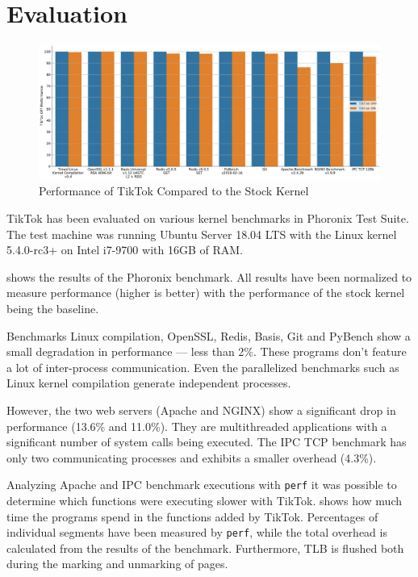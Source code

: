 \section{Evaluation}
\label{sec:evaluation}

\begin{figure}[]
  \centering
  \includegraphics[width=\linewidth]{img/eval.pdf}
  \caption{Performance of TikTok Compared to the Stock Kernel}
  \label{fig:tiktokeval}
\end{figure}


TikTok has been evaluated on various kernel benchmarks in Phoronix
Test Suite\cite{phoronix}. The test machine was running Ubuntu Server 18.04 LTS
with the Linux kernel 5.4.0-rc3+ on Intel i7-9700 with 16GB of RAM.

 shows the results of the Phoronix benchmark. All
results have been normalized to measure performance (higher is better) with the
performance of the stock kernel being the baseline.

Benchmarks Linux compilation, OpenSSL, Redis, Basis, Git and PyBench show a
small degradation in performance --- less than 2\%. These programs don't feature
a lot of inter-process communication. Even the parallelized benchmarks such as
Linux kernel compilation generate independent processes.

However, the two web servers (Apache and NGINX) show a significant drop in
performance (13.6\% and 11.0\%). They are multithreaded applications with a
significant number of system calls being executed. The IPC TCP benchmark has
only two communicating processes and exhibits a smaller overhead (4.3\%).

Analyzing Apache and IPC benchmark executions with \texttt{perf} it was possible
to determine which functions were executing slower with TikTok.
 shows how much time the programs spend in the functions added
by TikTok. Percentages of individual segments have been measured by
\texttt{perf}, while the total overhead is calculated from the results of the
benchmark. Furthermore, TLB is flushed both during the marking and unmarking of
pages.

